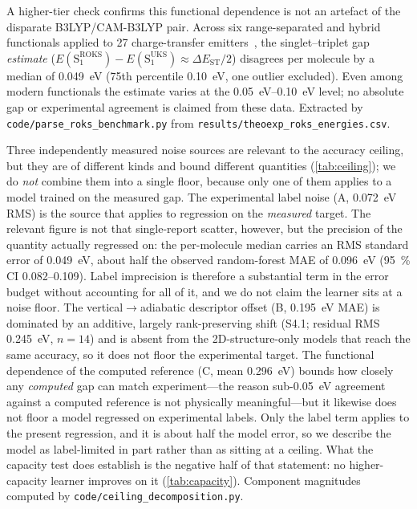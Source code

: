 \documentclass[twoside,twocolumn,9pt]{extarticle}
\begin{document}
A higher-tier check confirms this functional dependence is not an artefact of the
disparate B3LYP/CAM-B3LYP pair. Across six range-separated and hybrid functionals
applied to \num{27} charge-transfer emitters~\cite{Froitzheim2024}, the singlet--triplet gap \emph{estimate}
($E(\text{S}_1^\text{ROKS})-E(\text{S}_1^\text{UKS})\approx\Delta E_\text{ST}/2$)
disagrees per molecule by a median of \qty{0.049}{\electronvolt} (\num{75}th percentile
\qty{0.10}{\electronvolt}, one outlier excluded). Even among modern functionals the
estimate varies at the \qtyrange{0.05}{0.10}{\electronvolt} level; no absolute gap or
experimental agreement is claimed from these data. Extracted by
\texttt{code/parse\_roks\_benchmark.py} from \texttt{results/theoexp\_roks\_energies.csv}.

Three independently measured noise sources are relevant to the accuracy ceiling, but
they are of different kinds and bound different quantities (\cref{tab:ceiling}); we do
\emph{not} combine them into a single floor, because only one of them applies to a model
trained on the measured gap. The experimental label noise (A, \qty{0.072}{\electronvolt}
RMS) is the source that applies to regression on the \emph{measured} target. The relevant
figure is not that single-report scatter, however, but the precision of the quantity
actually regressed on: the per-molecule median carries an RMS standard error of
\qty{0.049}{\electronvolt}, about half the observed random-forest MAE of
\qty{0.096}{\electronvolt} (\qty{95}{\percent} CI \numrange{0.082}{0.109}). Label
imprecision is therefore a substantial term in the error budget without accounting for all
of it, and we do not claim the learner sits at a noise floor. The vertical$\rightarrow$adiabatic descriptor offset (B,
\qty{0.195}{\electronvolt} MAE) is dominated by an additive, largely rank-preserving shift
(S4.1; residual RMS \qty{0.245}{\electronvolt}, $n = 14$) and is absent
from the 2D-structure-only models that reach the same accuracy, so it does not floor the
experimental target. The functional dependence of the computed reference (C, mean
\qty{0.296}{\electronvolt}) bounds how closely any \emph{computed} gap can match
experiment---the reason sub-\qty{0.05}{\electronvolt} agreement against a computed
reference is not physically meaningful---but it likewise does not floor a model regressed
on experimental labels. Only the label term applies to the present regression, and it is
about half the model error, so we describe the model as label-limited in part rather than
as sitting at a ceiling. What the capacity test does establish is the negative half of that
statement: no higher-capacity learner improves on it (\cref{tab:capacity}). Component magnitudes computed by
\texttt{code/ceiling\_decomposition.py}.
\end{document}
